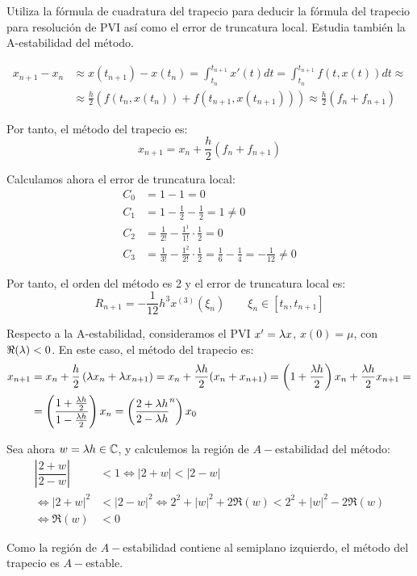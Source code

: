 \begin{ejercicio}
    Utiliza la fórmula de cuadratura del trapecio para deducir la fórmula del trapecio para resolución de PVI así como el error de truncatura local. Estudia también la A-estabilidad del método.

    \begin{align*}
        x_{n+1} - x_n &\approx x(t_{n+1}) - x(t_n) = \int_{t_n}^{t_{n+1}} x'(t)dt = \int_{t_n}^{t_{n+1}} f(t, x(t))dt
        \approx \\& \approx \frac{h}{2} \left( f(t_n, x(t_n)) + f(t_{n+1}, x(t_{n+1})) \right)
        \approx \frac{h}{2} \left( f_n + f_{n+1} \right)
    \end{align*}

    Por tanto, el método del trapecio es:
    \begin{equation*}
        x_{n+1} = x_n + \frac{h}{2} \left( f_n + f_{n+1} \right)
    \end{equation*}

    Calculamos ahora el error de truncatura local:
    \begin{align*}
        C_0 &= 1 - 1 = 0 \\
        C_1 &= 1 - \frac{1}{2} - \frac{1}{2} = 1 \neq 0 \\
        C_2 &= \frac{1}{2!} - \frac{1^1}{1!}\cdot \frac{1}{2} = 0\\
        C_3 &= \frac{1}{3!} - \frac{1^2}{2!}\cdot \frac{1}{2} = \frac{1}{6} - \frac{1}{4} = -\frac{1}{12}\neq 0
    \end{align*}

    Por tanto, el orden del método es 2 y el error de truncatura local es:
    \begin{equation*}
        R_{n+1} = -\frac{1}{12}h^3x^{(3)}(\xi_n) \qquad \xi_n \in [t_n, t_{n+1}]
    \end{equation*}

    Respecto a la A-estabilidad, consideramos el PVI $x'=\lambda x$, $x(0) = \mu$, con $\Re(\lambda) < 0$. En este caso, el método del trapecio es:
    \begin{align*}
        x_{n+1} &= x_n + \frac{h}{2} \left( \lambda x_n + \lambda x_{n+1} \right) = x_n + \frac{\lambda h}{2} (x_n + x_{n+1})
        = \left(1+ \frac{\lambda h}{2}\right)x_n + \frac{\lambda h}{2} x_{n+1}
        =\\&= \left(\dfrac{1+ \frac{\lambda h}{2}}{1 - \frac{\lambda h}{2}}\right)x_n
        = \left(\dfrac{2+ \lambda h}{2 - \lambda h}^n\right)x_0
    \end{align*}

    Sea ahora $w=\lambda h\in \mathbb{C}$, y calculemos la región de $A-$estabilidad del método:
    \begin{align*}
        \left|\dfrac{2+w}{2-w}\right| &< 1 \iff \left|2+w\right| < \left|2-w\right| \\
        \iff \left|2+w\right|^2 &< \left|2-w\right|^2
        \iff 2^2 + |w|^2 + 2\Re(w) < 2^2 + |w|^2 - 2\Re(w) \\
        \iff \Re(w) &< 0
    \end{align*}

    Como la región de $A-$estabilidad contiene al semiplano izquierdo, el método del trapecio es $A-$estable.
\end{ejercicio}


